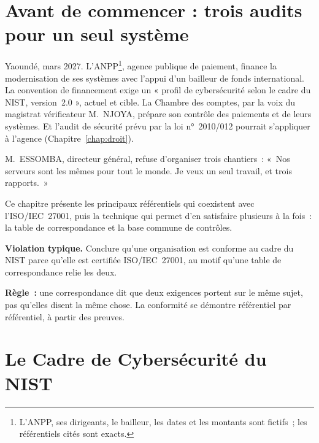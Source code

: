 \bigskip

\section*{Avant de commencer : trois audits pour un seul système}

Yaoundé, mars 2027. L'ANPP\footnote{L'ANPP, ses dirigeants, le bailleur,
les dates et les montants sont fictifs~; les référentiels cités sont
exacts.}, agence publique de paiement, finance la modernisation de ses
systèmes avec l'appui d'un bailleur de fonds international. La convention
de financement exige un « profil de cybersécurité selon le cadre du NIST,
version~2.0 », actuel et cible. La Chambre des comptes, par la voix du
magistrat vérificateur M.~NJOYA, prépare son contrôle des paiements et de
leurs systèmes. Et l'audit de sécurité prévu par la loi n°~2010/012 pourrait
s'appliquer à l'agence (Chapitre~\ref{chap:droit}).

M.~ESSOMBA, directeur général, refuse d'organiser trois chantiers~: «~Nos
serveurs sont les mêmes pour tout le monde. Je veux un seul travail, et
trois rapports.~»

\medskip

Ce chapitre présente les principaux référentiels qui coexistent avec
l'ISO/IEC~27001, puis la technique qui permet d'en satisfaire plusieurs à
la fois~: la table de correspondance et la base commune de contrôles.

\begin{boxalert}
\textbf{Violation typique.} Conclure qu'une organisation est conforme au
cadre du NIST parce qu'elle est certifiée ISO/IEC~27001, au motif qu'une
table de correspondance relie les deux.

\smallskip
\textbf{Règle~:} une correspondance dit que deux exigences portent sur le
même sujet, pas qu'elles disent la même chose. La conformité se démontre
référentiel par référentiel, à partir des preuves.
\end{boxalert}

\separateur

\section{Le Cadre de Cybersécurité du NIST}
\label{sec:c09-csf}

